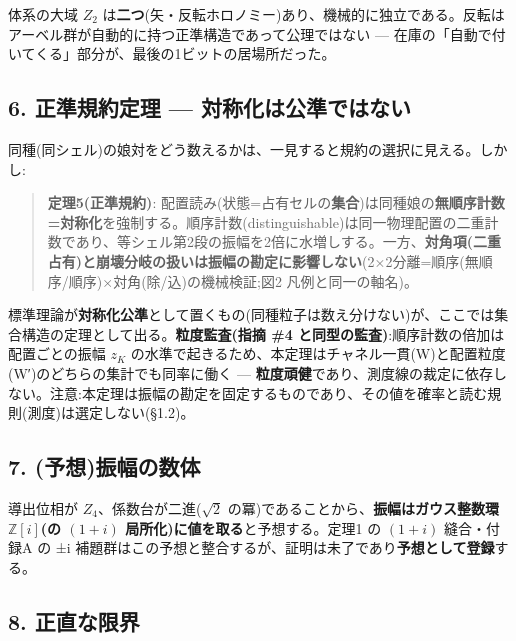 \documentclass[
]{ltjsarticle}
\begin{document}
体系の大域 \(Z_2\)
は\textbf{二つ}(矢・反転ホロノミー)あり、機械的に独立である。反転はアーベル群が自動的に持つ正準構造であって公理ではない
--- 在庫の「自動で付いてくる」部分が、最後の1ビットの居場所だった。

\subsection{6. 正準規約定理 ---
対称化は公準ではない}\label{ux6b63ux6e96ux898fux7d04ux5b9aux7406-ux5bfeux79f0ux5316ux306fux516cux6e96ux3067ux306fux306aux3044}

同種(同シェル)の娘対をどう数えるかは、一見すると規約の選択に見える。しかし:

\begin{quote}
\textbf{定理5(正準規約)}:
配置読み(状態=占有セルの\textbf{集合})は同種娘の\textbf{無順序計数=対称化}を強制する。順序計数(distinguishable)は同一物理配置の二重計数であり、等シェル第2段の振幅を2倍に水増しする。一方、\textbf{対角項(二重占有)と崩壊分岐の扱いは振幅の勘定に影響しない}(2×2分離=順序(無順序/順序)×対角(除/込)の機械検証;図2
凡例と同一の軸名)。
\end{quote}

標準理論が\textbf{対称化公準}として置くもの(同種粒子は数え分けない)が、ここでは集合構造の定理として出る。\textbf{粒度監査(指摘
\#4 と同型の監査)}:順序計数の倍加は配置ごとの振幅 \(z_K\)
の水準で起きるため、本定理はチャネル一貫(W)と配置粒度(W′)のどちらの集計でも同率に働く
---
\textbf{粒度頑健}であり、測度線の裁定に依存しない。注意:本定理は振幅の勘定を固定するものであり、その値を確率と読む規則(測度)は選定しない(§1.2)。

\subsection{7.
(予想)振幅の数体}\label{ux4e88ux60f3ux632fux5e45ux306eux6570ux4f53}

導出位相が \(Z_4\)、係数台が二進(\(\sqrt2\)
の冪)であることから、\textbf{振幅はガウス整数環 \(\mathbb{Z}[i]\)(の
\((1+i)\) 局所化)に値を取る}と予想する。定理1 の \((1+i)\) 縫合・付録A
の ±i
補題群はこの予想と整合するが、証明は未了であり\textbf{予想として登録}する。

\subsection{8. 正直な限界}\label{ux6b63ux76f4ux306aux9650ux754c}
\end{document}
